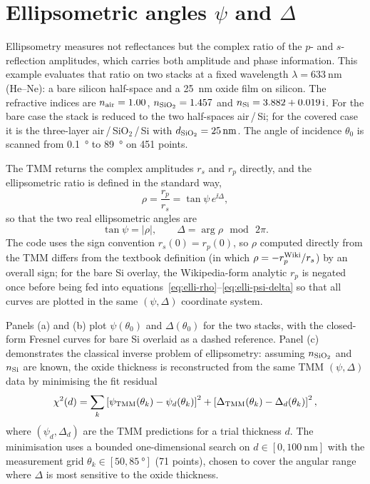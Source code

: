 \section{\texorpdfstring{Ellipsometric angles $\psi$ and $\Delta$}{Ellipsometric angles psi and Delta}}

Ellipsometry measures not reflectances but the complex ratio of the
$p$- and $s$-reflection amplitudes, which carries both amplitude and phase
information. This example evaluates that ratio on two stacks at a fixed
wavelength $\lambda = \SI{633}{\nano\metre}$ (He--Ne): a bare silicon
half-space and a \SI{25}{\nano\metre} oxide film on silicon. The
refractive indices are
$n_{\rm air} = 1.00$,
$n_{\rm SiO_2} = 1.457$ and
$n_{\rm Si} = 3.882 + 0.019\,\mathrm{i}$. For the bare case the stack is
reduced to the two half-spaces air\,/\,Si; for the covered case it is the
three-layer air\,/\,SiO$_2$\,/\,Si with
$d_{\rm SiO_2} = \SI{25}{\nano\metre}$. The angle of incidence $\theta_0$
is scanned from \SI{0.1}{\degree} to \SI{89}{\degree} on 451 points.

The TMM returns the complex amplitudes $r_s$ and $r_p$ directly, and the
ellipsometric ratio is defined in the standard way,
\begin{equation}
  \rho = \frac{r_p}{r_s} = \tan\psi\,e^{\ii\Delta}, \label{eq:elli-rho}
\end{equation}
so that the two real ellipsometric angles are
\begin{equation}
  \tan\psi = |\rho|,\qquad \Delta = \arg\rho\,\bmod\,2\pi. \label{eq:elli-psi-delta}
\end{equation}
The code uses the sign convention $r_s(0) = r_p(0)$, so $\rho$ computed
directly from the TMM differs from the textbook definition (in which
$\rho = -r_p^{\rm Wiki}/r_s$) by an overall sign; for the bare Si overlay,
the Wikipedia-form analytic $r_p$ is negated once before being fed into
equations~\eqref{eq:elli-rho}--\eqref{eq:elli-psi-delta} so that all
curves are plotted in the same $(\psi, \Delta)$ coordinate system.

Panels (a) and (b) plot $\psi(\theta_0)$ and $\Delta(\theta_0)$ for the
two stacks, with the closed-form Fresnel curves for bare Si overlaid as a
dashed reference. Panel (c) demonstrates the classical inverse problem of
ellipsometry: assuming $n_{\rm SiO_2}$ and $n_{\rm Si}$ are known, the
oxide thickness is reconstructed from the same TMM $(\psi, \Delta)$ data
by minimising the fit residual
\begin{equation}
  \chi^{2}(d) = \sum_{k}\left[\psi_{\rm TMM}(\theta_k) - \psi_d(\theta_k)\right]^{2} + \left[\Delta_{\rm TMM}(\theta_k) - \Delta_d(\theta_k)\right]^{2}, \label{eq:elli-chi2}
\end{equation}
where $(\psi_d, \Delta_d)$ are the TMM predictions for a trial thickness
$d$. The minimisation uses a bounded one-dimensional search on
$d \in [\SI{0}, \SI{100}{\nano\metre}]$ with the measurement grid
$\theta_k \in [\SI{50}, \SI{85}{\degree}]$ (71 points), chosen to cover the
angular range where $\Delta$ is most sensitive to the oxide thickness.

